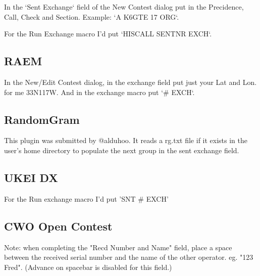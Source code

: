 \documentclass{article}
\begin{document}
In the `Sent Exchange` field of the New Contest dialog put in the Precidence, Call, Check and Section. Example: `A K6GTE 17 ORG`.

For the Run Exchange macro I'd put `{HISCALL} {SENTNR} {EXCH}`.

\subsection{RAEM}

In the New/Edit Contest dialog, in the exchange field put just your Lat and Lon. for me 33N117W. And in the exchange macro put `\# {EXCH}`.

\subsection{RandomGram}

This plugin was submitted by @alduhoo. It reads a rg.txt file if it exists in the user's home directory to populate the next group in the sent exchange field.

\subsection{UKEI DX}

For the Run exchange macro I'd put '{SNT} \# {EXCH}'

\subsection{CWO Open Contest}

Note: when completing the "Recd Number and Name" field, place a space between the received serial number and the name of the other operator. eg. "123 Fred". (Advance on spacebar is disabled for this field.)
\end{document}
